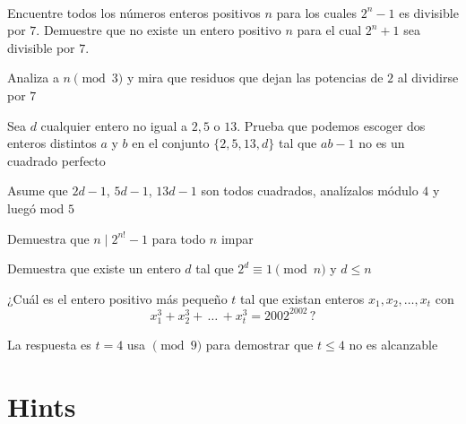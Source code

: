\documentclass[11pt]{scrartcl}
\begin{document}
\vspace{0.1cm}
\begin{problem}
\phantom \\
    \begin{walk}
        \ii Encuentre todos los números enteros positivos $ n$ para los cuales $ 2^n-1$ es divisible por $ 7$.
        \ii Demuestre que no existe un entero positivo $ n$ para el cual $ 2^n+1$ sea divisible por $ 7$.
    \end{walk}
 
\begin{hint}
    Analiza a $n\pmod 3$ y mira que residuos que dejan las potencias de $2$ al dividirse por $7$
\end{hint}
\end{problem}
\vspace{0.1cm}
\begin{problem}
    Sea $d$ cualquier entero no igual a $2,5$ o $13$. Prueba que podemos escoger dos enteros distintos $a$ y $b$ en el conjunto $\{2,5,13,d\}$ tal que $ab-1$ no es un cuadrado perfecto
    \begin{hint}
        Asume que $2d-1$, $5d-1$, $13d-1$ son todos cuadrados, analízalos módulo $4$ y luegó mod $5$
    \end{hint}
\end{problem}
\vspace{0.1cm}
\begin{problem}
    Demuestra que $n\mid 2^{n!}-1$ para todo $n$ impar
    \begin{hint}
        Demuestra que existe un entero $d$ tal que $2^d\equiv 1\pmod n$ y $d\leq n$
    \end{hint}
\end{problem}
\vspace{0.1cm}
\begin{problem}
    ¿Cuál es el entero positivo más pequeño $t$ tal que existan enteros $x_1,x_2,\ldots,x_t$ con \[x^3_1+x^3_2+\,\ldots\,+x^3_t=2002^{2002} \,?\]
    \begin{hint}
        La respuesta es $t=4$ usa $\pmod 9$ para demostrar que $t\leq 4$ no es alcanzable
    \end{hint}
\end{problem}





\bigskip

\section{Hints}
\begin{enumerate}
  
\end{enumerate}
\end{document}
